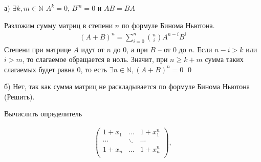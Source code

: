 \begin{sol}[Юля]
    а) 	$\exists k, m \in \mathbb{N}$ $A^k = 0$, $B^m = 0$ и $AB= BA$
    
    Разложим сумму матриц в степени $n$ по формуле Бинома Ньютона.
    \begin{gather*}
        (A + B)^n = \sum_{i=0}^{n}\binom{n}{i}A^{n-i}B^i
    \end{gather*}
    Степени при матрице $A$ идут от $n$ до 0, а при $B$ -- от 0 до $n$. Если $n - i > k$ или $i > m$, то слагаемое обращается в ноль. Значит, при $n \geqslant k + m$ сумма таких слагаемых будет равна 0, то есть $\exists n \in \mathbb{N}, (A + B)^n = 0$ \qed
    
    б) Нет, так как сумма матриц не раскладывается по формуле Бинома Ньютона (Решить).
\end{sol}

\begin{prb}
    Вычислить определитель
    
    \begin{gather*}
    \left(\begin{array}{ccc}
    1 + x_{1} & \ldots & 1 + x_{1}^n\\
    \cdots & \ddots & \cdots \\
    1 + x_{n} & \ldots & 1 + x_{n}^n\\
    \end{array}\right),
    \end{gather*}
\end{prb}

